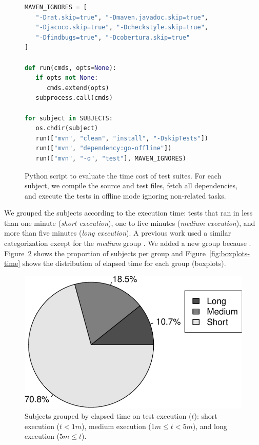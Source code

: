 \begin{figure}[h!]
\centering
\scriptsize
{}
\begin{lstlisting}[language=Python]
MAVEN_IGNORES = [
   "-Drat.skip=true", "-Dmaven.javadoc.skip=true",
   "-Djacoco.skip=true", "-Dcheckstyle.skip=true",
   "-Dfindbugs=true", "-Dcobertura.skip=true"
]

def run(cmds, opts=None):
   if opts not None:
      cmds.extend(opts)
   subprocess.call(cmds)

for subject in SUBJECTS:
   os.chdir(subject)
   run(["mvn", "clean", "install", "-DskipTests"])
   run(["mvn", "dependency:go-offline"])
   run(["mvn", "-o", "test"], MAVEN_IGNORES)
\end{lstlisting}
\caption{\label{fig:mvn-execution} Python script to evaluate the time cost of
    test suites. For each subject, we compile the source and test files, fetch
    all dependencies, and execute the tests in offline mode ignoring
    non-related tasks.}
\end{figure}

We grouped the subjects according to the execution time: tests that
ran in less than one minute (\emph{short execution}), one to five
minutes (\emph{medium execution}), and more than five minutes
(\emph{long execution}). A previous work used a similar categorization
except for the \emph{medium} group \cite{gligoric-etal-issta2015}.  We
added a new group because .  Figure~\ref{fig:piechart-time} shows the proportion
of subjects per group and Figure~\ref{fig:boxplots-time} shows the
distribution of elapsed time for each group (boxplots).

\begin{figure}[h!]
    \centering
    \begin{minipage}{2in}%
    \includegraphics[width=\textwidth]{plots/piechart-timecost.pdf}
    \end{minipage}%
    \caption{\label{fig:piechart-time} Subjects grouped by elapsed time on test
    execution ($t$): short execution ($t < 1m$), medium execution ($1m \leq t <
    5m$), and long execution ($5m \leq t$).}
\end{figure}

